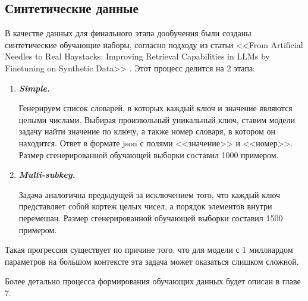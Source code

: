\newpage

\subsection{Синтетические данные}
\label{subsec:synth_data} 

В качестве данных для финального этапа дообучения были созданы синтетические обучающие наборы, согласно подходу из статьи <<From Artificial Needles to Real Haystacks: Improving
Retrieval Capabilities in LLMs by Finetuning on
Synthetic Data>> \cite{synth_needle}. Этот процесс делится на 2 этапа:

\begin{enumerate}
  
  \item \textit{\textbf{Simple.}}

    Генерируем список словарей, в которых каждый ключ и значение являются целыми числами. Выбирая произвольный уникальный ключ, ставим модели задачу найти значение по ключу, а также номер словаря, в котором он находится. Ответ в формате json с полями <<значение>> и <<номер>>. Размер сгенерированной обучающей выборки составил 1000 примером.
  
  \item \textit{\textbf{Multi-subkey.}}

    Задача аналогична предыдущей за исключением того, что каждый ключ представляет собой кортеж целых чисел, а порядок элементов внутри перемешан. Размер сгенерированной обучающей выборки составил 1500 примером.
  
\end{enumerate}

Такая прогрессия существует по причине того, что для модели с 1 миллиардом параметров на большом контексте эта задача может оказаться слишком сложной.

Более детально процесса формирования обучающих данных будет описан в главе 7.

\newpage






